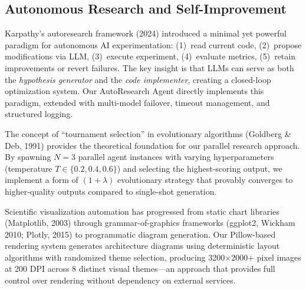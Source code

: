 \subsection{Autonomous Research and Self-Improvement}

Karpathy's autoresearch framework (2024) introduced a minimal yet powerful paradigm for autonomous AI experimentation: (1)~read current code, (2)~propose modifications via LLM, (3)~execute experiment, (4)~evaluate metrics, (5)~retain improvements or revert failures. The key insight is that LLMs can serve as both the \textit{hypothesis generator} and the \textit{code implementer}, creating a closed-loop optimization system. Our AutoResearch Agent directly implements this paradigm, extended with multi-model failover, timeout management, and structured logging.

The concept of ``tournament selection'' in evolutionary algorithms (Goldberg \& Deb, 1991) provides the theoretical foundation for our parallel research approach. By spawning $N=3$ parallel agent instances with varying hyperparameters (temperature $T \in \{0.2, 0.4, 0.6\}$) and selecting the highest-scoring output, we implement a form of $(1+\lambda)$ evolutionary strategy that provably converges to higher-quality outputs compared to single-shot generation.

Scientific visualization automation has progressed from static chart libraries (Matplotlib, 2003) through grammar-of-graphics frameworks (ggplot2, Wickham 2010; Plotly, 2015) to programmatic diagram generation. Our Pillow-based rendering system generates architecture diagrams using deterministic layout algorithms with randomized theme selection, producing 3200$\times$2000+ pixel images at 200 DPI across 8 distinct visual themes---an approach that provides full control over rendering without dependency on external services.
